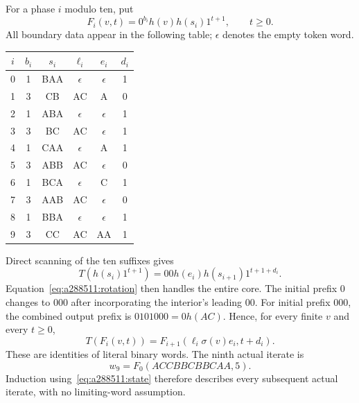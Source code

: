 For a phase $i$ modulo ten, put
\[
F_i(v,t)=0^{b_i}h(v)h(s_i)1^{t+1},\qquad t\ge0.
\]
All boundary data appear in the following table; $\epsilon$ denotes the
empty token word.
\begin{center}
\begin{tabular}{c|c|c|c|c|c}
$i$&$b_i$&$s_i$&$\ell_i$&$e_i$&$d_i$\\\hline
0&1&BAA&$\epsilon$&$\epsilon$&1\\
1&3&CB&AC&A&0\\
2&1&ABA&$\epsilon$&$\epsilon$&1\\
3&3&BC&AC&$\epsilon$&1\\
4&1&CAA&$\epsilon$&A&1\\
5&3&ABB&AC&$\epsilon$&0\\
6&1&BCA&$\epsilon$&C&1\\
7&3&AAB&AC&$\epsilon$&0\\
8&1&BBA&$\epsilon$&$\epsilon$&1\\
9&3&CC&AC&AA&1
\end{tabular}
\end{center}
Direct scanning of the ten suffixes gives
\[
T(h(s_i)1^{t+1})=00h(e_i)h(s_{i+1})1^{t+1+d_i}.
\]
Equation~\eqref{eq:a288511:rotation} then handles the entire core. The
initial prefix $0$ changes to $000$ after incorporating the interior's
leading $00$. For initial prefix $000$, the combined output prefix is
$0101000=0h(AC)$. Hence, for every finite $v$ and every $t\ge0$,
\begin{equation}
T(F_i(v,t))=F_{i+1}(\ell_i\sigma(v)e_i,t+d_i).
\label{eq:a288511:state}
\end{equation}
These are identities of literal binary words. The ninth actual iterate is
\[
w_9=F_0(ACCBBCBBCAA,5).
\]
Induction using~\eqref{eq:a288511:state} therefore describes every subsequent
actual iterate, with no limiting-word assumption.

